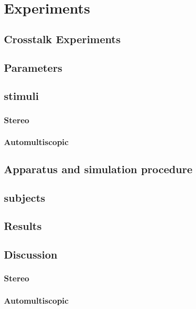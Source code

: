 \chapter{Experiments}
\label{chap:experiments}

\section{Crosstalk Experiments}

\section{Parameters}

\section{stimuli}
\subsection{Stereo}
\subsection{Automultiscopic}


\section{Apparatus and simulation procedure}

\section{subjects}

\section{Results}

\section {Discussion}
\subsection{Stereo}
\subsection{Automultiscopic}


